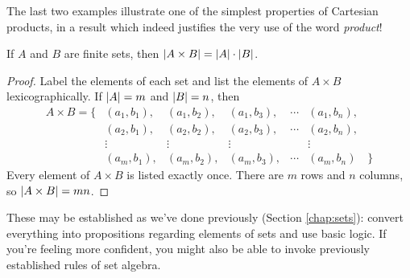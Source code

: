 
The last two examples illustrate one of the simplest properties of Cartesian products, in a result which indeed justifies the very use of the word \emph{product}!

\begin{thm}{}{}
	If $A$ and $B$ are finite sets, then $\left| A\times B\right|=\left| A\right|\cdot\left| B\right|$.
\end{thm}

\begin{proof}
	Label the elements of each set and list the elements of $A\times B$ lexicographically. If $\left| A\right|=m$ and $\left| B\right|=n$, then
	\[
		\begin{array}{rccccccl}
			A\times B=\big\{&(a_1,b_1),&(a_1,b_2),&(a_1,b_3),&\cdots&(a_1,b_n),&\\
			&(a_2,b_1),&(a_2,b_2),&(a_2,b_3),&\cdots&(a_2,b_n),&\\
			&\vdots&\vdots&\vdots&&\vdots&\\
			&(a_m,b_1),&(a_m,b_2),&(a_m,b_3),&\cdots&(a_m,b_n)&\big\}
		\end{array}
	\]
	Every element of $A\times B$ is listed exactly once. There are $m$ rows and $n$ columns, so $\left| A\times B\right|=mn$.
\end{proof}


These may be established as we've done previously (Section \ref{chap:sets}): convert everything into propositions regarding elements of sets and use basic logic. If you're feeling more confident, you might also be able to invoke previously established rules of set algebra.

